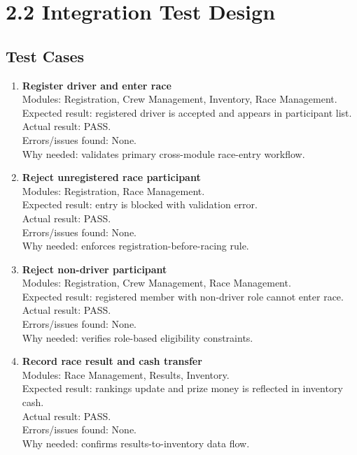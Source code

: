 \documentclass[11pt,a4paper]{article}
\begin{document}
\section{2.2 Integration Test Design}
\subsection{Test Cases}
\begin{enumerate}
\item \textbf{Register driver and enter race}\\
Modules: Registration, Crew Management, Inventory, Race Management.\\
Expected result: registered driver is accepted and appears in participant list.\\
Actual result: PASS.\\
Errors/issues found: None.\\
Why needed: validates primary cross-module race-entry workflow.

\item \textbf{Reject unregistered race participant}\\
Modules: Registration, Race Management.\\
Expected result: entry is blocked with validation error.\\
Actual result: PASS.\\
Errors/issues found: None.\\
Why needed: enforces registration-before-racing rule.

\item \textbf{Reject non-driver participant}\\
Modules: Registration, Crew Management, Race Management.\\
Expected result: registered member with non-driver role cannot enter race.\\
Actual result: PASS.\\
Errors/issues found: None.\\
Why needed: verifies role-based eligibility constraints.

\item \textbf{Record race result and cash transfer}\\
Modules: Race Management, Results, Inventory.\\
Expected result: rankings update and prize money is reflected in inventory cash.\\
Actual result: PASS.\\
Errors/issues found: None.\\
Why needed: confirms results-to-inventory data flow.


\end{enumerate}
\end{document}
